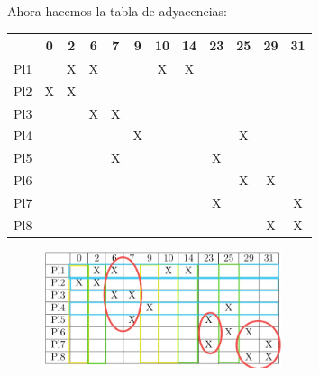\documentclass[a4paper,12pt]{article}
\begin{document}
\begin{enumerate}[label=\textcolor{teal}{\textbf{\arabic*.}}]
        Ahora hacemos la tabla de adyacencias:
        \begin{center}
            \begin{tabular}{|c|c|c|c|c|c|c|c|c|c|c|c|}
                \hline
                    & 0 & 2 & 6 & 7 & 9 & 10 & 14 & 23 & 25 & 29 & 31\\ \hline
                Pl1 &   & X & X &   &   &  X &  X &    &    &    &   \\ \hline 
                Pl2 & X & X &   &   &   &    &    &    &    &    &   \\ \hline 
                Pl3 &   &   & X & X &   &    &    &    &    &    &   \\ \hline 
                Pl4 &   &   &   &   & X &    &    &    & X  &    &   \\ \hline 
                Pl5 &   &   &   & X &   &    &    &  X &    &    &   \\ \hline 
                Pl6 &   &   &   &   &   &    &    &    & X  & X  &   \\ \hline 
                Pl7 &   &   &   &   &   &    &    & X  &    &    & X \\ \hline 
                Pl8 &   &   &   &   &   &    &    &    &    & X  & X \\ \hline 
            \end{tabular}
        \end{center}
        \hfill

        \begin{figure}[h]
            \centering
            \includegraphics[width=7cm]{img/12.png}
        \end{figure}


\end{enumerate}
\end{document}
